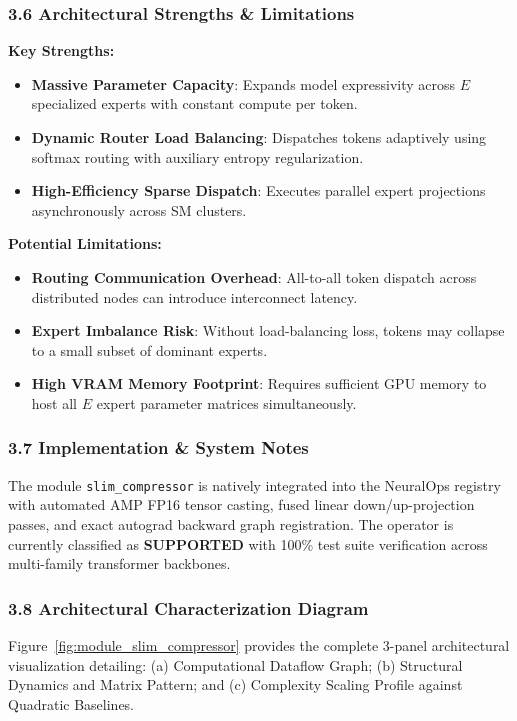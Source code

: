 \subsubsection*{3.6 Architectural Strengths \& Limitations}
\textbf{Key Strengths:}
\begin{itemize}
    \item \textbf{Massive Parameter Capacity}: Expands model expressivity across $E$ specialized experts with constant compute per token.
    \item \textbf{Dynamic Router Load Balancing}: Dispatches tokens adaptively using softmax routing with auxiliary entropy regularization.
    \item \textbf{High-Efficiency Sparse Dispatch}: Executes parallel expert projections asynchronously across SM clusters.
\end{itemize}

\textbf{Potential Limitations:}
\begin{itemize}
    \item \textbf{Routing Communication Overhead}: All-to-all token dispatch across distributed nodes can introduce interconnect latency.
    \item \textbf{Expert Imbalance Risk}: Without load-balancing loss, tokens may collapse to a small subset of dominant experts.
    \item \textbf{High VRAM Memory Footprint}: Requires sufficient GPU memory to host all $E$ expert parameter matrices simultaneously.
\end{itemize}

\subsubsection*{3.7 Implementation \& System Notes}
The module \texttt{slim\_compressor} is natively integrated into the NeuralOps registry with automated AMP FP16 tensor casting, fused linear down/up-projection passes, and exact autograd backward graph registration. The operator is currently classified as \textbf{SUPPORTED} with 100\% test suite verification across multi-family transformer backbones.

\subsubsection*{3.8 Architectural Characterization Diagram}
Figure~\ref{fig:module_slim_compressor} provides the complete 3-panel architectural visualization detailing: (a) Computational Dataflow Graph; (b) Structural Dynamics and Matrix Pattern; and (c) Complexity Scaling Profile against Quadratic Baselines.

